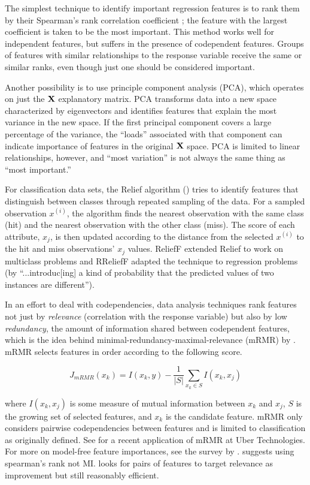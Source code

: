 \documentclass[twoside,11pt]{article}
\newcommand{\todo}[1]{{{\color{red}{[#1]}}}}
\renewcommand{\xi}{x^{(i)}}
\begin{document}
The simplest technique to identify important regression features is to rank them by their Spearman's rank correlation coefficient \cite{spearmans}; the feature with the largest coefficient is taken to be the most important. This method works well for independent features, but suffers in the presence of codependent features.   Groups of features with similar relationships to the response variable receive the same or similar ranks, even though just one should be considered important.

Another possibility is to use principle component analysis (PCA), which operates on just the $\bf X$ explanatory matrix. PCA transforms data into a new space characterized by eigenvectors and identifies features that explain the most variance in the new space. If the first principal component covers a large percentage of the variance, the ``loads'' associated with that component can indicate importance of features in the original $\bf X$ space. PCA is limited to linear relationships, however, and ``most variation'' is not always the same thing as ``most important.''

For classification data sets, the Relief algorithm (\cite{relief}) tries to identify features that distinguish between classes through repeated sampling of the data. For a sampled observation $\xi$, the algorithm finds the nearest observation with the same class (hit) and the nearest observation with the other class (miss). The score of each attribute, $x_j$, is then updated according to the distance from the selected $\xi$ to the hit and miss observations'  $x_j$ values. ReliefF \cite{ReliefF} extended Relief to work on multiclass problems and RReliefF \cite{RReliefF} adapted the technique to regression problems (by ``...introduc[ing] a kind of probability that the predicted values of two instances are different'').

In an effort to deal with codependencies, data analysis techniques rank features not just by {\em relevance} (correlation with the response variable) but also by low {\em redundancy}, the amount of information shared between codependent features, which is the idea behind minimal-redundancy-maximal-relevance (mRMR) by \cite{mRMR}. mRMR selects features in order according to the following score.

\[
J_{mRMR}(x_k) = I(x_k, y) - \frac{1}{|S|} \sum_{x_k \in S} I(x_k, x_j)
\]

\noindent where $I(x_k, x_j)$ is some measure of mutual information between $x_k$ and $x_j$, $S$ is the growing set of selected features, and $x_k$ is the candidate feature. mRMR only considers pairwise codependencies between features and is limited to classification as originally defined. See \cite{ubermRMR} for a recent application of mRMR at Uber Technologies.  For more on model-free feature importances, see the survey by \cite{survey}. \todo{does not consider multi-feature to target requirements, just one feature to target but often combo is important. computing cat-to-num MI is hard. discretize or estimate density but not obvious how to pick bins or parzen window width etc...} \cite{tsanas} suggests using spearman's rank not MI. \cite{meyer-microarray} looks for pairs of features to target relevance as improvement but still reasonably efficient.
\end{document}
